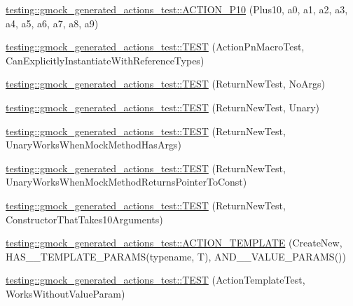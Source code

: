 \begin{DoxyCompactItemize}
\item 
\hyperlink{namespacetesting_1_1gmock__generated__actions__test_a4e48e01a7bfc369d279cc0c99a7d3c60}{testing\+::gmock\+\_\+generated\+\_\+actions\+\_\+test\+::\+A\+C\+T\+I\+O\+N\+\_\+\+P10} (Plus10, a0, a1, a2, a3, a4, a5, a6, a7, a8, a9)
\item 
\hyperlink{namespacetesting_1_1gmock__generated__actions__test_a20664d32f08c53d6f9fa5e020a85fab3}{testing\+::gmock\+\_\+generated\+\_\+actions\+\_\+test\+::\+T\+E\+ST} (Action\+Pn\+Macro\+Test, Can\+Explicitly\+Instantiate\+With\+Reference\+Types)
\item 
\hyperlink{namespacetesting_1_1gmock__generated__actions__test_a058a3d17071ddb888319ab71b491af94}{testing\+::gmock\+\_\+generated\+\_\+actions\+\_\+test\+::\+T\+E\+ST} (Return\+New\+Test, No\+Args)
\item 
\hyperlink{namespacetesting_1_1gmock__generated__actions__test_a64f3f8327d51c139b441846e809ae4bc}{testing\+::gmock\+\_\+generated\+\_\+actions\+\_\+test\+::\+T\+E\+ST} (Return\+New\+Test, Unary)
\item 
\hyperlink{namespacetesting_1_1gmock__generated__actions__test_ad8f696b14b0f2dba4986c53f615aef15}{testing\+::gmock\+\_\+generated\+\_\+actions\+\_\+test\+::\+T\+E\+ST} (Return\+New\+Test, Unary\+Works\+When\+Mock\+Method\+Has\+Args)
\item 
\hyperlink{namespacetesting_1_1gmock__generated__actions__test_ad9f45ddc4a5616b919116c766ad37a30}{testing\+::gmock\+\_\+generated\+\_\+actions\+\_\+test\+::\+T\+E\+ST} (Return\+New\+Test, Unary\+Works\+When\+Mock\+Method\+Returns\+Pointer\+To\+Const)
\item 
\hyperlink{namespacetesting_1_1gmock__generated__actions__test_a1ed6392f4aeb68b9429ff7dd98ce5a86}{testing\+::gmock\+\_\+generated\+\_\+actions\+\_\+test\+::\+T\+E\+ST} (Return\+New\+Test, Constructor\+That\+Takes10\+Arguments)
\item 
\hyperlink{namespacetesting_1_1gmock__generated__actions__test_a1debc0726715951fcd7f5443e436dc46}{testing\+::gmock\+\_\+generated\+\_\+actions\+\_\+test\+::\+A\+C\+T\+I\+O\+N\+\_\+\+T\+E\+M\+P\+L\+A\+TE} (Create\+New, H\+A\+S\+\_\+\_\+\+T\+E\+M\+P\+L\+A\+T\+E\+\_\+\+P\+A\+R\+A\+MS(typename, T), A\+N\+D\+\_\+\_\+\+V\+A\+L\+U\+E\+\_\+\+P\+A\+R\+A\+MS())
\item 
\hyperlink{namespacetesting_1_1gmock__generated__actions__test_aaac879cbe00638dcc2d4733760180a4f}{testing\+::gmock\+\_\+generated\+\_\+actions\+\_\+test\+::\+T\+E\+ST} (Action\+Template\+Test, Works\+Without\+Value\+Param)
\item 

\end{DoxyCompactItemize}
